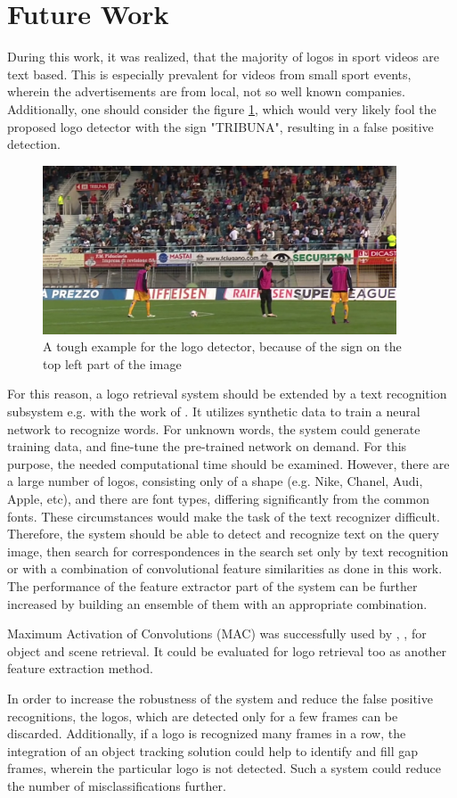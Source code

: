 \section{Future Work}
During this work, it was realized, that the majority of logos in sport videos are text based. This is especially prevalent for videos from small sport events, wherein the advertisements are from local, not so well known companies.
Additionally, one should consider the figure \ref{f:logodetectorfool}, which would very likely fool the proposed logo detector with the sign "TRIBUNA", resulting in a false positive detection.
\begin{figure}
  \centering
  \includegraphics[height=50mm]{images/mt/logodetectorfool.png}
  \caption{A tough example for the logo detector, because of the sign on the top left part of the image}
  \label{f:logodetectorfool}
\end{figure}
For this reason, a logo retrieval system should be extended by a text recognition subsystem e.g. with the work of \cite{Jaderberg14d}. It utilizes synthetic data to train a neural network to recognize words. For unknown words, the system could generate training data, and fine-tune the pre-trained network on demand. For this purpose, the needed computational time should be examined.
However, there are a large number of logos, consisting only of a shape (e.g. Nike, Chanel, Audi, Apple, etc),  and there are font types, differing significantly from the common fonts. These circumstances would make the task of the text recognizer difficult. Therefore, the system should be able to detect and recognize text on the query image, then search for correspondences in the search set only by text recognition or with a combination of convolutional feature similarities as done in this work. The performance of the feature extractor part of the system can be further increased by building an ensemble of them with an appropriate combination.

Maximum Activation of Convolutions (MAC) was successfully used by \cite{DBLP:journals/corr/ToliasSJ15}, \cite{DBLP:journals/corr/AzizpourRSMC14}, \cite{DBLP:journals/corr/RadenovicTC16} for object and scene retrieval. It could be evaluated for logo retrieval too as another feature extraction method.

In order to increase the robustness of the system and reduce the false positive recognitions, the logos, which are detected only for a few frames can be discarded. Additionally, if a logo is recognized many frames in a row, the integration of an object tracking solution could help to identify and fill gap frames, wherein the particular logo is not detected. Such a system could reduce the number of misclassifications further.